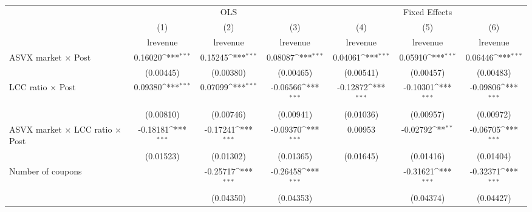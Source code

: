 \begin{table}[htbp]\centering
\def\sym#1{\ifmmode^{#1}\else\(^{#1}\)\fi}
\caption{ \label{post4revenue}}
\begin{tabular}{l*{6}{c}}
\toprule
                    &\multicolumn{3}{c}{OLS}                                          &\multicolumn{3}{c}{Fixed Effects}                                \\\cmidrule(lr){2-4}\cmidrule(lr){5-7}
                    &\multicolumn{1}{c}{(1)}&\multicolumn{1}{c}{(2)}&\multicolumn{1}{c}{(3)}&\multicolumn{1}{c}{(4)}&\multicolumn{1}{c}{(5)}&\multicolumn{1}{c}{(6)}\\
                    &\multicolumn{1}{c}{lrevenue}&\multicolumn{1}{c}{lrevenue}&\multicolumn{1}{c}{lrevenue}&\multicolumn{1}{c}{lrevenue}&\multicolumn{1}{c}{lrevenue}&\multicolumn{1}{c}{lrevenue}\\
\midrule
ASVX market $\times$ Post&     0.16020\sym{***}&     0.15245\sym{***}&     0.08087\sym{***}&     0.04061\sym{***}&     0.05910\sym{***}&     0.06446\sym{***}\\
                    &   (0.00445)         &   (0.00380)         &   (0.00465)         &   (0.00541)         &   (0.00457)         &   (0.00483)         \\
\addlinespace
LCC ratio $\times$ Post&     0.09380\sym{***}&     0.07099\sym{***}&    -0.06566\sym{***}&    -0.12872\sym{***}&    -0.10301\sym{***}&    -0.09806\sym{***}\\
                    &   (0.00810)         &   (0.00746)         &   (0.00941)         &   (0.01036)         &   (0.00957)         &   (0.00972)         \\
\addlinespace
ASVX market $\times$ LCC ratio $\times$ Post&    -0.18181\sym{***}&    -0.17241\sym{***}&    -0.09370\sym{***}&     0.00953         &    -0.02792\sym{**} &    -0.06705\sym{***}\\
                    &   (0.01523)         &   (0.01302)         &   (0.01365)         &   (0.01645)         &   (0.01416)         &   (0.01404)         \\
\addlinespace
Number of coupons   &                     &    -0.25717\sym{***}&    -0.26458\sym{***}&                     &    -0.31621\sym{***}&    -0.32371\sym{***}\\
                    &                     &   (0.04350)         &   (0.04353)         &                     &   (0.04374)         &   (0.04427)         \\

\end{tabular}
\end{table}
